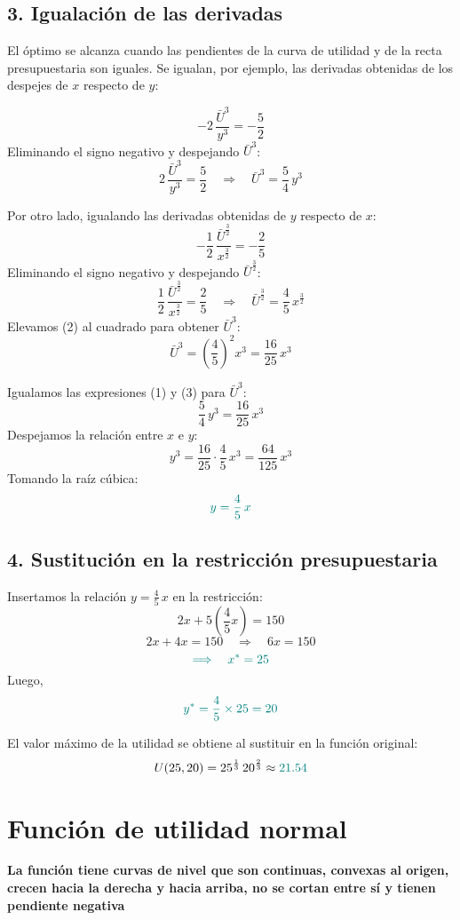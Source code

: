 \documentclass{article}
\begin{document}
\subsection*{3. Igualación de las derivadas}

El óptimo se alcanza cuando las pendientes de la curva de utilidad y de la recta presupuestaria son iguales. Se igualan, por ejemplo, las derivadas obtenidas de los despejes de \(x\) respecto de \(y\):

\[
-2\,\frac{\bar{U}^3}{y^3} = -\frac{5}{2}
\]
Eliminando el signo negativo y despejando \(\bar{U}^3\):
\[
2\,\frac{\bar{U}^3}{y^3} = \frac{5}{2} \quad \Longrightarrow \quad \bar{U}^3 = \frac{5}{4}\,y^3 \tag{1}
\]

Por otro lado, igualando las derivadas obtenidas de \(y\) respecto de \(x\):
\[
-\frac{1}{2}\,\frac{\bar{U}^{\frac{3}{2}}}{x^{\frac{3}{2}}} = -\frac{2}{5}
\]
Eliminando el signo negativo y despejando \(\bar{U}^{\frac{3}{2}}\):
\[
\frac{1}{2}\,\frac{\bar{U}^{\frac{3}{2}}}{x^{\frac{3}{2}}} = \frac{2}{5} \quad \Longrightarrow \quad \bar{U}^{\frac{3}{2}} = \frac{4}{5}\,x^{\frac{3}{2}} \tag{2}
\]
Elevamos (2) al cuadrado para obtener \(\bar{U}^3\):
\[
\bar{U}^3 = \left(\frac{4}{5}\right)^2 x^3 = \frac{16}{25}\,x^3 \tag{3}
\]

Igualamos las expresiones (1) y (3) para \(\bar{U}^3\):
\[
\frac{5}{4}\,y^3 = \frac{16}{25}\,x^3
\]
Despejamos la relación entre \(x\) e \(y\):
\[
y^3 = \frac{16}{25}\cdot\frac{4}{5}\,x^3 = \frac{64}{125}\,x^3
\]
Tomando la raíz cúbica:
\[\color{teal}
y = \frac{4}{5}\,x
\]

\subsection*{4. Sustitución en la restricción presupuestaria}

Insertamos la relación \( y=\frac{4}{5}\,x \) en la restricción:
\[
2x + 5\left(\frac{4}{5}x\right)=150
\]
\[
2x+4x = 150 \quad \Longrightarrow \quad 6x=150
\]
\[\color{teal}
\Longrightarrow \quad x^* = 25
\]
Luego,
\[\color{teal}
y^* = \frac{4}{5}\times 25 = 20
\]

El valor máximo de la utilidad se obtiene al sustituir en la función original:
\[
U(25,20)= 25^{\frac{1}{3}}\, 20^{\frac{2}{3}} \approx \color{teal} 21.54
\]

\section*{Función de utilidad normal}
\textbf{\color{teal}La función tiene curvas de nivel que son continuas, convexas al origen, crecen hacia la derecha y hacia arriba, no se cortan entre sí y tienen pendiente negativa}
\end{document}
